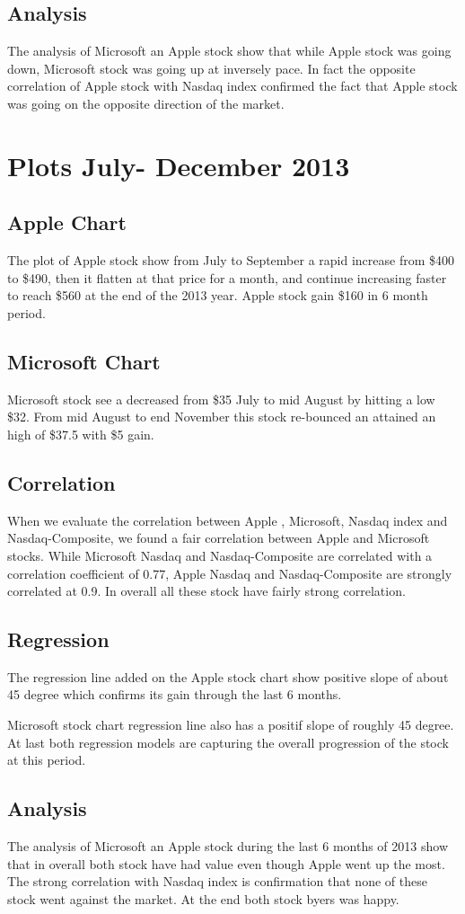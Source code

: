 \documentclass{article}[14pt]
\begin{document}
\subsection{Analysis}
The analysis of Microsoft an Apple stock show that while Apple stock was going down, Microsoft stock was going up at inversely pace. In fact the opposite correlation of Apple stock with Nasdaq index confirmed the fact that Apple stock was going on the opposite direction of the market.

\section{Plots July- December 2013}

\subsection{Apple Chart}

The plot of Apple stock show from July to September a rapid increase from \$400 to \$490, then it flatten at that price for a month, and continue increasing faster to reach \$560 at the end of the 2013 year. Apple stock gain \$160 in 6 month period.

\subsection{Microsoft Chart}

Microsoft stock see a decreased from \$35 July to mid August by hitting a low \$32. From mid August to end November this stock re-bounced an attained an high of \$37.5 with \$5 gain.
\subsection{Correlation}
When we evaluate the correlation between Apple , Microsoft, Nasdaq index and Nasdaq-Composite, we found a fair correlation between  Apple and Microsoft stocks. While Microsoft Nasdaq and Nasdaq-Composite are correlated with a correlation coefficient of 0.77, Apple  Nasdaq and Nasdaq-Composite are strongly correlated at 0.9. In overall all these stock have fairly strong correlation.
\subsection{Regression}
The regression line added on the Apple stock chart show positive slope of about 45 degree which confirms its gain through the last 6 months.

Microsoft stock chart regression line also has a positif slope of roughly 45 degree. At last both regression models are capturing the overall progression of the stock at this period. 

\subsection{Analysis}
The analysis of Microsoft an Apple stock during the last 6 months of 2013 show that in overall both stock have had value even though Apple went up the most. The strong correlation with Nasdaq index is confirmation that none of these stock went against the market. At the end both stock byers was happy. 
\end{document}
